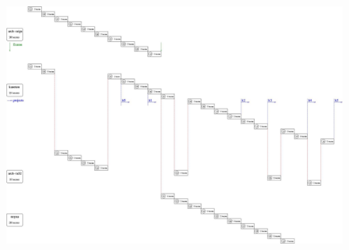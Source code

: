 \begin{multicols}{2}
\end{multicols}

\begin{figure}[h]
\centerline{\includegraphics[angle=-90,scale=0.3]{figures/schedule.jpg}}
\end{figure}


